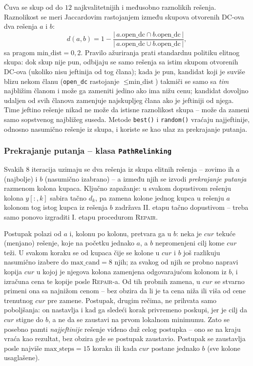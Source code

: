 \documentclass[12pt,a4paper]{article}
\begin{document}
Čuva se skup od do $12$ najkvalitetnijih i međusobno raznolikih rešenja.
Raznolikost se meri Jaccardovim rastojanjem između skupova otvorenih DC-ova
dva rešenja $a$ i $b$:
\begin{equation} \label{eq:jaccard}
d(a,b) = 1 - \frac{|\,a.\text{open\_dc} \cap b.\text{open\_dc}\,|}
               {|\,a.\text{open\_dc} \cup b.\text{open\_dc}\,|},
\end{equation}
sa pragom $\text{min\_dist} = 0{,}2$. Pravilo ažuriranja prati standardnu
politiku elitnog skupa: dok skup nije pun, odbijaju se samo rešenja sa istim
skupom otvorenih DC-ova (ukoliko nisu jeftinija od tog člana);
kada je pun, kandidat koji je suviše blizu nekom članu (\texttt{open\_dc}
rastojanje $\leq \text{min\_dist}$) takmiči se samo sa \textit{tim} najbližim
članom i može ga zameniti jedino ako ima nižu cenu; kandidat dovoljno udaljen
od svih članova zamenjuje najskupljeg člana ako je jeftiniji od njega. Time
jeftino rešenje nikad ne može da istisne raznolikost skupa -- može da zameni
samo sopstvenog najbližeg suseda. Metode \texttt{best()} i \texttt{random()}
vraćaju najjeftinije, odnosno nasumično rešenje iz skupa, i koriste se kao ulaz
za prekrajanje putanja.

\subsubsection{Prekrajanje putanja -- klasa \texttt{PathRelinking}}

Svakih $8$ iteracija uzimaju se dva rešenja iz skupa elitnih rešenja -- zovimo
ih $a$ (najbolje) i $b$ (nasumično izabrano) -- a između njih se izvodi
\textit{prekrajanje putanja} razmenom kolona kupaca. Ključno zapažanje: u
svakom dopustivom rešenju kolona $y[:,k]$ sabira tačno $d_k$, pa zamena
kolone jednog kupca u rešenju $a$ kolonom tog istog kupca iz rešenja $b$
zadržava II. etapu tačno dopustivom -- treba samo ponovo izgraditi I. etapu
procedurom \textsc{Repair}.

Postupak polazi od $a$ i, kolonu po kolonu, pretvara ga u $b$: neka je $cur$
tekuće (menjano) rešenje, koje na početku jednako $a$, a $b$ nepromenjeni
cilj kome $cur$ teži. U svakom koraku se od kupaca čije se kolone u $cur$ i
$b$ još razlikuju nasumično izabere do $\text{max\_cand} = 8$ njih; za
svakog od njih se probno napravi kopija $cur$ u kojoj je njegova kolona
zamenjena odgovarajućom kolonom iz $b$, i izračuna cena te kopije posle
\textsc{Repair}-a. Od tih probnih zamena, u $cur$ se stvarno primeni ona sa
najnižom cenom -- bez obzira da li je ta cena niža ili viša od cene
trenutnog $cur$ pre zamene. Postupak, drugim rečima, ne prihvata samo
poboljšanja: on nastavlja i kad ga sledeći korak privremeno poskupi, jer je
cilj da $cur$ stigne do $b$, a ne da se zaustavi na prvom lokalnom
minimumu. Zato se posebno pamti \emph{najjeftinije} rešenje viđeno
duž celog postupka -- ono se na kraju vraća kao rezultat, bez obzira gde se
postupak zaustavio. Postupak se zaustavlja posle najviše
$\text{max\_steps} = 15$ koraka ili kada $cur$ postane jednako $b$ (sve
kolone usaglašene).
\end{document}
